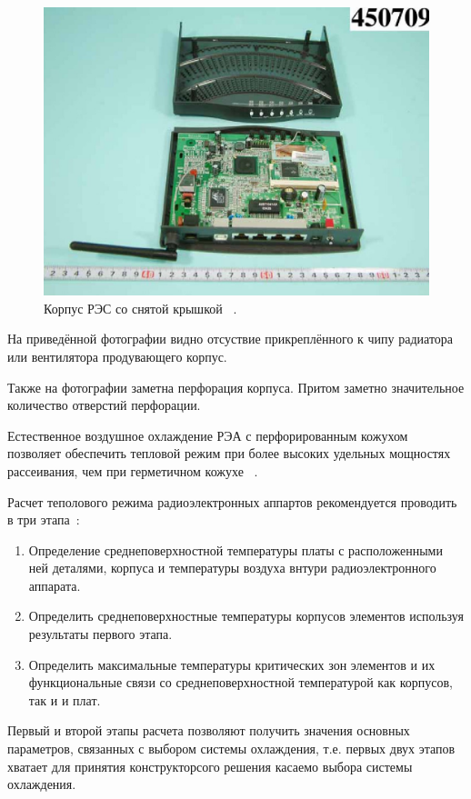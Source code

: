 \begin{figure}[h]
  \centering
  \includegraphics[scale = 0.60]{images/internal-0.jpg}
  \caption{Корпус РЭС со снятой крышкой ~\cite{INTERNAL-PHOTOS}.}
\end{figure}

На приведённой фотографии видно отсуствие прикреплённого к чипу
радиатора или вентилятора продувающего корпус.

Также на фотографии заметна перфорация корпуса. Притом заметно
значительное количество отверстий перфорации.

Естественное воздушное охлаждение РЭА с перфорированным кожухом
позволяет обеспечить тепловой режим при более высоких удельных
мощностях рассеивания, чем при герметичном кожухе ~\cite{Rotkop1976}.


Расчет теполового режима радиоэлектронных аппартов рекомендуется
проводить в три этапа~\cite{Rotkop1976}:
\begin{enumerate}[label={\arabic*.}]
  \item Определение среднеповерхностной температуры платы с
расположенными ней деталями, корпуса и температуры воздуха внтури
радиоэлектронного аппарата.
  \item Определить среднеповерхностные температуры корпусов элементов
  используя результаты первого этапа.
  \item Определить максимальные температуры критических зон элементов и
их функциональные связи со среднеповерхностной температурой как
корпусов, так и и плат.
\end{enumerate}

Первый и второй этапы расчета позволяют получить значения основных
параметров, связанных с выбором системы охлаждения, т.е. первых двух
этапов хватает для принятия конструкторсого решения касаемо выбора
системы охлаждения.

